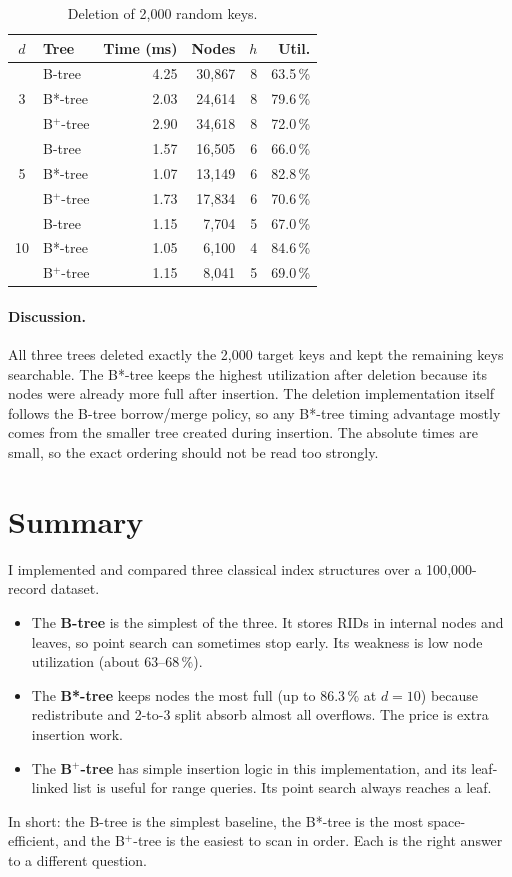 \documentclass[sigconf]{acmart}
\begin{document}
\begin{table}[h]
\centering
\small
\caption{Deletion of 2{,}000 random keys.}
\label{tab:delete}
\begin{tabular}{cl rrrr}
\toprule
$d$ & Tree & Time (ms) & Nodes & $h$ & Util. \\
\midrule
\multirow{3}{*}{3}
 & B-tree   & 4.25 & 30{,}867 & 8 & 63.5\,\% \\
 & B*-tree  & 2.03 & 24{,}614 & 8 & 79.6\,\% \\
 & B$^+$-tree & 2.90 & 34{,}618 & 8 & 72.0\,\% \\
\midrule
\multirow{3}{*}{5}
 & B-tree   & 1.57 & 16{,}505 & 6 & 66.0\,\% \\
 & B*-tree  & 1.07 & 13{,}149 & 6 & 82.8\,\% \\
 & B$^+$-tree & 1.73 & 17{,}834 & 6 & 70.6\,\% \\
\midrule
\multirow{3}{*}{10}
 & B-tree   & 1.15 &  7{,}704 & 5 & 67.0\,\% \\
 & B*-tree  & 1.05 &  6{,}100 & 4 & 84.6\,\% \\
 & B$^+$-tree & 1.15 &  8{,}041 & 5 & 69.0\,\% \\
\bottomrule
\end{tabular}
\end{table}

\paragraph{Discussion.} All three trees deleted exactly the 2{,}000
target keys and kept the remaining keys searchable. The B*-tree keeps
the highest utilization after deletion because its nodes were already
more full after insertion. The deletion implementation itself follows
the B-tree borrow/merge policy, so any B*-tree timing advantage mostly
comes from the smaller tree created during insertion. The absolute
times are small, so the exact ordering should not be read too strongly.

\section{Summary}

I implemented and compared three classical index structures over a
100{,}000-record dataset.

\begin{itemize}
\item The \textbf{B-tree} is the simplest of the three. It stores RIDs
in internal nodes and leaves, so point search can sometimes stop
early. Its weakness is low node utilization (about $63$--$68\,\%$).
\item The \textbf{B*-tree} keeps nodes the most full (up to
$86.3\,\%$ at $d=10$) because redistribute and 2-to-3 split absorb
almost all overflows. The price is extra insertion work.
\item The \textbf{B$^+$-tree} has simple insertion logic in this
implementation, and its leaf-linked list is useful for range queries.
Its point search always reaches a leaf.
\end{itemize}

In short: the B-tree is the simplest baseline, the B*-tree is the
most space-efficient, and the B$^+$-tree is the easiest to scan in
order. Each is the right answer to a different question.

%
%
\end{document}
